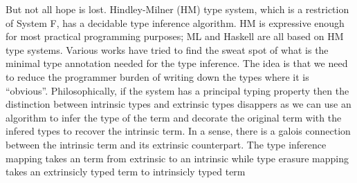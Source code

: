 \documentclass[manuscript,screen,nonacm]{acmart}
\begin{document}
But not all hope is lost. Hindley-Milner (HM) type system, which is a restriction of System F, has a decidable type inference algorithm. HM is expressive enough for most practical programming purposes; ML and Haskell are all based on HM type systems.
Various works have tried to find the sweat spot of what is the minimal type annotation needed for the type inference.
The idea is that we need to reduce the programmer burden of writing down the types where it is ``obvious''.
Philosophically, if the system has a principal typing property then the distinction between intrinsic types and extrinsic types disappers as we can use an algorithm to infer the type of the term and decorate the original term with the infered types to recover the intrinsic term. In a sense, there is a galois connection between the intrinsic term and its extrinsic counterpart. The type inference mapping takes an term from extrinsic to an intrinsic while type erasure mapping takes an extrinsicly typed term to intrinsicly typed term



\end{document}
